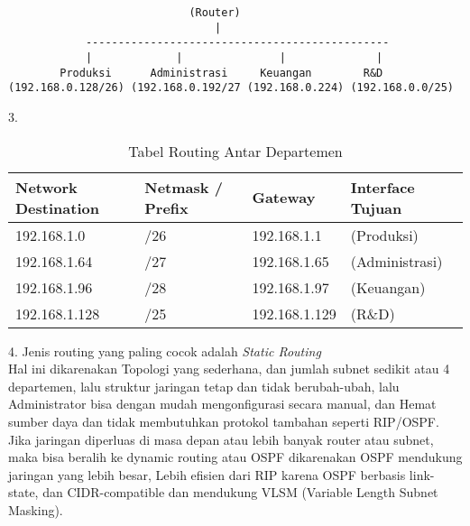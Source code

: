 \begin{enumerate}
\begin{verbatim}
                            (Router)       
                                |
            -----------------------------------------------
            |             |               |              |
        Produksi      Administrasi     Keuangan        R&D
(192.168.0.128/26) (192.168.0.192/27 (192.168.0.224) (192.168.0.0/25)
\end{verbatim}
3. \begin{table}[h!]
\centering
\begin{tabular}{|l|l|l|l|}
\hline
\textbf{Network Destination} & \textbf{Netmask / Prefix} & \textbf{Gateway} & \textbf{Interface Tujuan} \\
\hline
192.168.1.0       & /26 & 192.168.1.1   & (Produksi) \\
192.168.1.64      & /27 & 192.168.1.65  & (Administrasi) \\
192.168.1.96      & /28 & 192.168.1.97  & (Keuangan) \\
192.168.1.128     & /25 & 192.168.1.129 & (R\&D) \\
\hline
\end{tabular}
\caption{Tabel Routing Antar Departemen}
\end{table}

4. Jenis routing yang paling cocok adalah \textit{Static Routing}\\
Hal ini dikarenakan Topologi yang sederhana, dan jumlah subnet sedikit atau 4 departemen, lalu struktur jaringan tetap dan tidak berubah-ubah, lalu Administrator bisa dengan mudah mengonfigurasi secara manual, dan Hemat sumber daya dan tidak membutuhkan protokol tambahan seperti RIP/OSPF.\\

Jika jaringan diperluas di masa depan atau lebih banyak router atau subnet, maka bisa beralih ke dynamic routing atau OSPF dikarenakan OSPF mendukung jaringan yang lebih besar, Lebih efisien dari RIP karena OSPF berbasis link-state, dan CIDR-compatible dan mendukung VLSM (Variable Length Subnet Masking).
\end{enumerate}